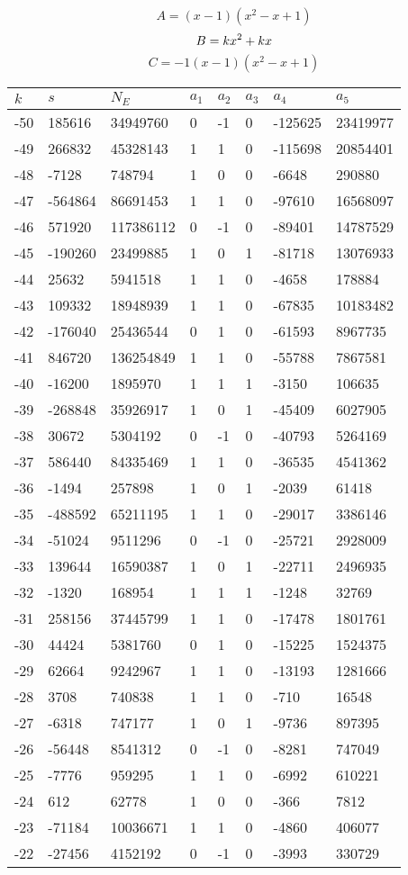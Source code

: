 \documentclass{amsart}
\begin{document}
$$A=(x
 - 1)(x^2
 - x
 + 1)$$
$$B=k\*x^2
 + k\*x$$
$$C=-1(x
 - 1)(x^2
 - x
 + 1)$$
\begin{longtable}{|l|l|l|lllll|}
\hline
$k$ & $s$ & $N_E$ & $a_1$ & $a_2$ & $a_3$ & $a_4$ & $a_5$\\
\hline
-50&185616&34949760&0&-1&0&-125625&23419977\\
-49&266832&45328143&1&1&0&-115698&20854401\\
-48&-7128&748794&1&0&0&-6648&290880\\
-47&-564864&86691453&1&1&0&-97610&16568097\\
-46&571920&117386112&0&-1&0&-89401&14787529\\
-45&-190260&23499885&1&0&1&-81718&13076933\\
-44&25632&5941518&1&1&0&-4658&178884\\
-43&109332&18948939&1&1&0&-67835&10183482\\
-42&-176040&25436544&0&1&0&-61593&8967735\\
-41&846720&136254849&1&1&0&-55788&7867581\\
-40&-16200&1895970&1&1&1&-3150&106635\\
-39&-268848&35926917&1&0&1&-45409&6027905\\
-38&30672&5304192&0&-1&0&-40793&5264169\\
-37&586440&84335469&1&1&0&-36535&4541362\\
-36&-1494&257898&1&0&1&-2039&61418\\
-35&-488592&65211195&1&1&0&-29017&3386146\\
-34&-51024&9511296&0&-1&0&-25721&2928009\\
-33&139644&16590387&1&0&1&-22711&2496935\\
-32&-1320&168954&1&1&1&-1248&32769\\
-31&258156&37445799&1&1&0&-17478&1801761\\
-30&44424&5381760&0&1&0&-15225&1524375\\
-29&62664&9242967&1&1&0&-13193&1281666\\
-28&3708&740838&1&1&0&-710&16548\\
-27&-6318&747177&1&0&1&-9736&897395\\
-26&-56448&8541312&0&-1&0&-8281&747049\\
-25&-7776&959295&1&1&0&-6992&610221\\
-24&612&62778&1&0&0&-366&7812\\
-23&-71184&10036671&1&1&0&-4860&406077\\
-22&-27456&4152192&0&-1&0&-3993&330729\\

\end{longtable}
\end{document}
